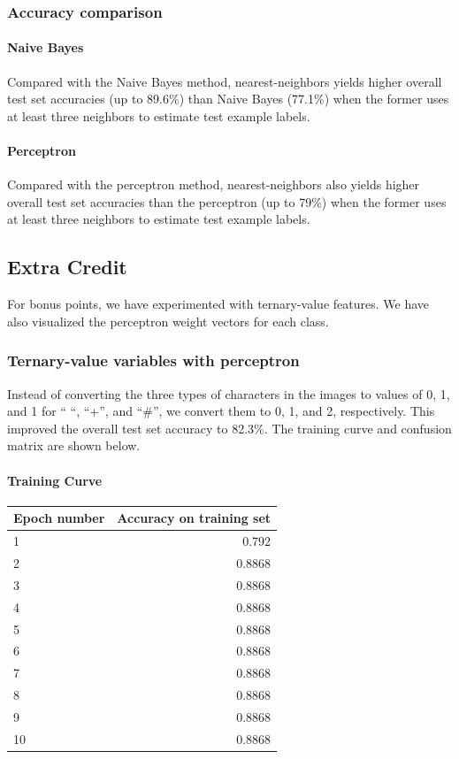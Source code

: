 \subsubsection{Accuracy comparison}
\paragraph{Naive Bayes} Compared with the Naive Bayes method, nearest-neighbors yields higher overall test set accuracies (up to 89.6\%) than Naive Bayes (77.1\%) when the former uses at least three neighbors to estimate test example labels.

\paragraph{Perceptron} Compared with the perceptron method, nearest-neighbors also yields higher overall test set accuracies than the perceptron (up to 79\%) when the former uses at least three neighbors to estimate test example labels.


\subsection{Extra Credit}
For bonus points, we have experimented with ternary-value features. We have also visualized the perceptron weight vectors for each class.

\subsubsection{Ternary-value variables with perceptron} Instead of converting the three types of characters in the images to values of 0, 1, and 1 for `` ``, ``+'', and ``\#'', we convert them to 0, 1, and 2, respectively. This improved the overall test set accuracy to 82.3\%. The training curve and confusion matrix are shown below.
\paragraph{Training Curve\\}
\begin{tabular}{l|r}
Epoch number & Accuracy on training set \\
\hline
1 & 0.792 \\
2 & 0.8868 \\
3 & 0.8868 \\
4 & 0.8868 \\
5 & 0.8868 \\
6 & 0.8868 \\
7 & 0.8868 \\
8 & 0.8868 \\
9 & 0.8868 \\
10 & 0.8868 \\
\end{tabular}

